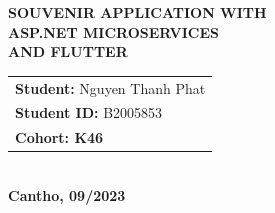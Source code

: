 \begin{titlepage}
\begin{center}
        \textbf{{\Large SOUVENIR APPLICATION WITH\\ASP.NET MICROSERVICES \\ AND FLUTTER}}
        \\[3.5cm]

        \begin{tabular}{ l l }
            \multicolumn{2}{l}{\textbf{Student:} Nguyen Thanh Phat  } \\
            \multicolumn{2}{l}{\textbf{Student ID:} B2005853}         \\
            \multicolumn{2}{l}{\textbf{Cohort: K46}}                  \\
        \end{tabular}
        \\[4.5cm]

        \textbf{Cantho, 09/2023}

    \end{center}

\end{titlepage}

